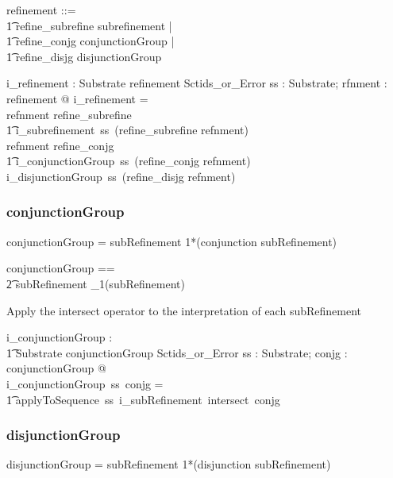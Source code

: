 \documentclass{article}
\def\bnf#1{{\scriptsize {{#1}} }}
\begin{document}
\begin{zed}
refinement ::= \\
\t1 refine\_subrefine \ldata subrefinement \rdata | \\
\t1 refine\_conjg \ldata conjunctionGroup \rdata | \\
\t1 refine\_disjg \ldata disjunctionGroup \rdata
\end{zed}

\begin{gendef}
   i\_refinement : Substrate \fun refinement \fun Sctids\_or\_Error
\where
   \forall ss : Substrate; rfnment : refinement @ i\_refinement = \\
   \IF refnment \in \ran refine\_subrefine \\
\t1 \THEN i\_subrefinement~ss~(refine\_subrefine \inv refnment) \\
   \ELSE \IF refnment \in \ran refine\_conjg \\
\t1 \THEN i\_conjunctionGroup~ss~(refine\_conjg \inv refnment) \\
   \ELSE i\_disjunctionGroup~ss~(refine\_disjg \inv refnment)
\end{gendef}

\subsubsection{conjunctionGroup}
\begin{framed}
\noindent
\bnf{conjunctionGroup = subRefinement 1*(conjunction subRefinement)}
\end{framed}

\begin{zed}
conjunctionGroup == \\
\t2 subRefinement \cross \seq_1(subRefinement)
\end{zed}

Apply the intersect operator to the interpretation of each  subRefinement

\begin{gendef}
    i\_conjunctionGroup : \\
\t1 Substrate \fun conjunctionGroup \fun Sctids\_or\_Error
\where
   \forall ss : Substrate;  conjg : conjunctionGroup @ \\
i\_conjunctionGroup~ss~conjg = \\
\t1 applyToSequence~ss~i\_subRefinement~intersect~conjg
\end{gendef}


\subsubsection{disjunctionGroup}
\begin{framed}
\noindent
\bnf{disjunctionGroup = subRefinement 1*(disjunction subRefinement)}
\end{framed}
\end{document}
